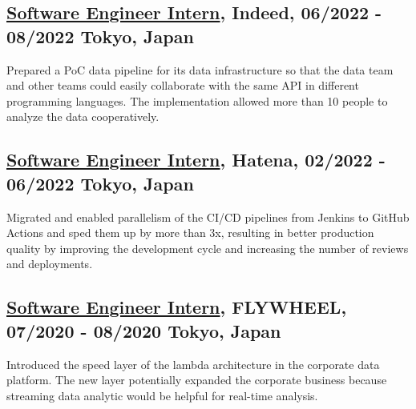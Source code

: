 \documentclass[10pt]{article}
\begin{document}
    \subsection*{ \underline{Software Engineer Intern}, Indeed, 06/2022 - 08/2022 \hfill Tokyo, Japan}
        Prepared a PoC data pipeline for its data infrastructure so that the data team and other teams could easily collaborate with the same API in different programming languages.
        The implementation allowed more than 10 people to analyze the data cooperatively.
    \subsection*{ \underline{Software Engineer Intern}, Hatena, 02/2022 - 06/2022 \hfill Tokyo, Japan}
        Migrated and enabled parallelism of the CI/CD pipelines from Jenkins to GitHub Actions and sped them up by more than 3x, resulting in better production quality by improving the development cycle and increasing the number of reviews and deployments.
    \subsection*{ \underline{Software Engineer Intern}, FLYWHEEL, 07/2020 - 08/2020 \hfill Tokyo, Japan}
        Introduced the speed layer of the lambda architecture in the corporate data platform.
        The new layer potentially expanded the corporate business because streaming data analytic would be helpful for real-time analysis.

\end{document}
